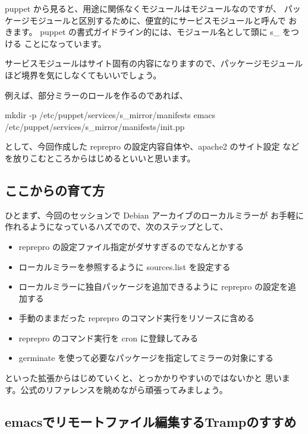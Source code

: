 \documentclass[mingoth,a4paper]{jsarticle}
\begin{document}
puppet から見ると、用途に関係なくモジュールはモジュールなのですが、
パッケージモジュールと区別するために、便宜的にサービスモジュールと呼んで
おきます。
puppet の書式ガイドライン的には、モジュール名として頭に s\_ をつける
ことになっています。

サービスモジュールはサイト固有の内容になりますので、パッケージモジュール
ほど境界を気にしなくてもいいでしょう。

例えば、部分ミラーのロールを作るのであれば、

\begin{commandline}
mkdir -p /etc/puppet/services/s_mirror/manifests
emacs /etc/puppet/services/s_mirror/manifests/init.pp
\end{commandline}

として、今回作成した reprepro の設定内容自体や、apache2 のサイト設定
などを放りこむところからはじめるといいと思います。

\subsection{ここからの育て方}

ひとまず、今回のセッションで Debian アーカイブのローカルミラーが
お手軽に作れるようになっているハズでので、次のステップとして、

\begin{itemize}
\item reprepro の設定ファイル指定がダサすぎるのでなんとかする
\item ローカルミラーを参照するように sources.list を設定する
\item ローカルミラーに独自パッケージを追加できるように reprepro の設定を追加する
\item 手動のままだった reprepro のコマンド実行をリソースに含める
\item reprepro のコマンド実行を cron に登録してみる
\item germinate を使って必要なパッケージを指定してミラーの対象にする
\end{itemize}

といった拡張からはじめていくと、とっかかりやすいのではないかと
思います。公式のリファレンスを眺めながら頑張ってみましょう。


\subsection{emacsでリモートファイル編集するTrampのすすめ}
\end{document}

